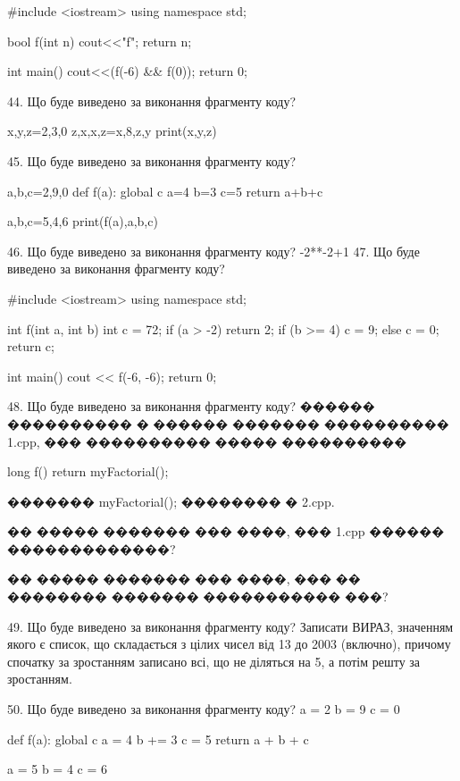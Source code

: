 \documentclass[11pt]{article}
\begin{document}
#include <iostream>
using namespace std;

bool f(int n){
    cout<<"f";
    return n;
}

int main(){
    cout<<(f(-6) && f(0));
    return 0;
}

44. Що буде виведено за виконання фрагменту коду?

x,y,z=2,3,0
z,x,x,z=x,8,z,y
print(x,y,z)

45. Що буде виведено за виконання фрагменту коду?

a,b,c=2,9,0
def f(a):
global c    a=4
    b=3
    c=5
    return a+b+c

a,b,c=5,4,6
print(f(a),a,b,c)

46. Що буде виведено за виконання фрагменту коду?
-2**-2+1
47. Що буде виведено за виконання фрагменту коду?

#include <iostream>
using namespace std;

int f(int a, int b){
    int c = 72;
    if (a > -2)
        return 2;
    if (b >= 4)
         c = 9;
    else 
        c = 0;
    return c;
}

int main(){
    cout << f(-6, -6);
    return 0;
}

48. Що буде виведено за виконання фрагменту коду?
������ ���������� � ������ ������� ���������� 1.cpp, ��� ���������� ����� ����������\par
long f(){ return myFactorial();}\par
������� myFactorial(); �������� � 2.cpp.\par
�� ����� ������� ��� ����, ��� 1.cpp ������ �������������?\par\vspace{1.5cm}
�� ����� ������� ��� ����, ��� �� �������� ������� ����������� ���?\par

49. Що буде виведено за виконання фрагменту коду?
Записати ВИРАЗ, значенням якого є список, що складається з цілих чисел від 13 до 2003 (включно), причому спочатку за зростанням записано всі, що не діляться на 5, а потім решту за зростанням.

50. Що буде виведено за виконання фрагменту коду?
a = 2
b = 9
c = 0

def f(a):
global c    a = 4
    b += 3
    c = 5
    return a + b + c

a = 5
b = 4
c = 6
\end{document}
